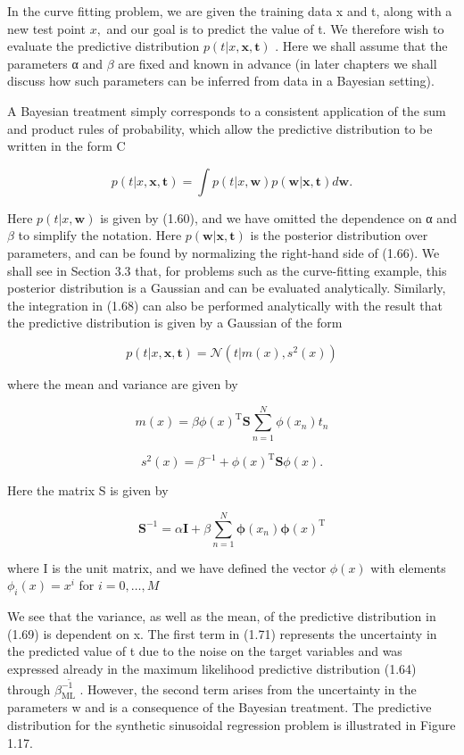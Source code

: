 \documentclass[
  10
]{article}
\begin{document}
In the curve fitting problem, we are given the training data x and t,
along with a new test point \(x ,\) and our goal is to predict the value
of t. We therefore wish to evaluate the predictive distribution
\(p ( t | x , \mathbf { x } , \mathbf { t } )\) . Here we shall assume
that the parameters α and \(\beta\) are fixed and known in advance (in
later chapters we shall discuss how such parameters can be inferred from
data in a Bayesian setting).

A Bayesian treatment simply corresponds to a consistent application of
the sum and product rules of probability, which allow the predictive
distribution to be written in the form C

\[
p (t | x, \mathbf {x}, \mathbf {t}) = \int p (t | x, \mathbf {w}) p (\mathbf {w} | \mathbf {x}, \mathbf {t}) d \mathbf {w}.\tag{1.68}
\]

Here \(p ( t | x , \mathbf { w } )\) is given by (1.60), and we have
omitted the dependence on α and \(\beta\) to simplify the notation. Here
\(p ( \mathbf { w } | \mathbf { x } , \mathbf { t } )\) is the posterior
distribution over parameters, and can be found by normalizing the
right-hand side of (1.66). We shall see in Section 3.3 that, for
problems such as the curve-fitting example, this posterior distribution
is a Gaussian and can be evaluated analytically. Similarly, the
integration in (1.68) can also be performed analytically with the result
that the predictive distribution is given by a Gaussian of the form

\[
p (t | x, \mathbf {x}, \mathbf {t}) = \mathcal {N} \left(t | m (x), s ^ {2} (x)\right)\tag{1.69}
\]

where the mean and variance are given by

\[
m (x) = \beta \phi (x) ^ {\mathrm{T}} \mathbf {S} \sum_ {n = 1} ^ {N} \phi (x _ {n}) t _ {n}\tag{1.70}
\]

\[
s ^ {2} (x) = \beta^ {- 1} + \phi (x) ^ {\mathrm{T}} \mathbf {S} \phi (x).\tag{1.71}
\]

Here the matrix S is given by

\[
\mathbf {S} ^ {- 1} = \alpha \mathbf {I} + \beta \sum_ {n = 1} ^ {N} \boldsymbol {\phi} (x _ {n}) \boldsymbol {\phi} (x) ^ {\mathrm{T}}\tag{1.72}
\]

where I is the unit matrix, and we have defined the vector
\(\phi ( x )\) with elements \(\phi _ { i } ( x ) = x ^ { i }\) for
\(i = 0 , \ldots , M\)

We see that the variance, as well as the mean, of the predictive
distribution in (1.69) is dependent on x. The first term in (1.71)
represents the uncertainty in the predicted value of t due to the noise
on the target variables and was expressed already in the maximum
likelihood predictive distribution (1.64) through
\(\beta _ { \mathrm { M L } } ^ { - \tilde { 1 } }\) . However, the
second term arises from the uncertainty in the parameters w and is a
consequence of the Bayesian treatment. The predictive distribution for
the synthetic sinusoidal regression problem is illustrated in Figure
1.17.
\end{document}
